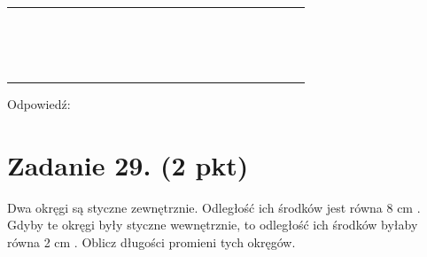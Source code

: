 \documentclass[10pt]{article}
\begin{document}
\begin{center}
\begin{tabular}{|c|c|c|c|c|c|c|c|c|c|c|c|c|c|c|c|c|c|c|c|c|c|c|c|}
\hline
 &  &  &  &  &  &  &  &  &  &  &  &  &  &  &  &  &  &  &  &  &  &  &  \\
\hline
 &  &  &  &  &  &  &  &  &  &  &  &  &  &  &  &  &  &  &  &  &  &  &  \\
\hline
 &  &  &  &  &  &  &  &  &  &  &  &  &  &  &  &  &  &  &  &  &  &  &  \\
\hline
 &  &  &  &  &  &  &  &  &  &  &  &  &  &  &  &  &  &  &  &  &  &  &  \\
\hline
 &  &  &  &  &  &  &  &  &  &  &  &  &  &  &  &  &  &  &  &  &  &  &  \\
\hline
 &  &  &  &  &  &  &  &  &  &  &  &  &  &  &  &  &  &  &  &  &  &  &  \\
\hline
 &  &  &  &  &  &  &  &  &  &  &  &  &  &  &  &  &  &  &  &  &  &  &  \\
\hline
 &  &  &  &  &  &  &  &  &  &  &  &  &  &  &  &  &  &  &  &  &  &  &  \\
\hline
 &  &  &  &  &  &  &  &  &  &  &  &  &  &  &  &  &  &  &  &  &  &  &  \\
\hline
 &  &  &  &  &  &  &  &  &  &  &  &  &  &  &  &  &  &  &  &  &  &  &  \\
\hline
 &  &  &  &  &  &  &  &  &  &  &  &  &  &  &  &  &  &  &  &  &  &  &  \\
\hline
 &  &  &  &  &  &  &  &  &  &  &  &  &  &  &  &  &  &  &  &  &  &  &  \\
\hline
 &  &  &  &  &  &  &  &  &  &  &  &  &  &  &  &  &  &  &  &  &  &  &  \\
\hline
 &  &  &  &  &  &  &  &  &  &  &  &  &  &  &  &  &  &  &  &  &  &  &  \\
\hline
 &  &  &  &  &  &  &  &  &  &  &  &  &  &  &  &  &  &  &  &  &  &  &  \\
\hline
 &  &  &  &  &  &  &  &  &  &  &  &  &  &  &  &  &  &  &  &  &  &  &  \\
\hline
 &  &  &  &  &  &  &  &  &  &  &  &  &  &  &  &  &  &  &  &  &  &  &  \\
\hline
\end{tabular}
\end{center}

Odpowiedź: \(\qquad\)

\section*{Zadanie 29. (2 pkt)}
Dwa okręgi są styczne zewnętrznie. Odległość ich środków jest równa 8 cm . Gdyby te okręgi były styczne wewnętrznie, to odległość ich środków byłaby równa 2 cm . Oblicz długości promieni tych okręgów.
\end{document}
